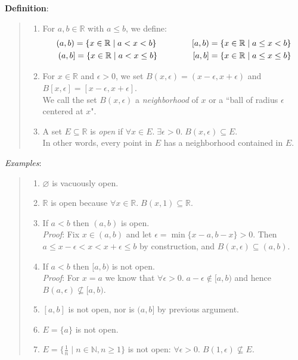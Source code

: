 \documentclass[11pt]{article}
\begin{document}
\textbf{Definition}:
\begin{quote}\vspace{-0.3cm}
\begin{enumerate}
	\item For $a,b \in \mathbb{R}$ with $a \leq b$, we define:
	\begin{align*}
		(a,b) = \{x \in \mathbb{R} \mid a < x < b\} \hspace{1.5cm} [a, b) = \{x \in \mathbb{R} \mid a \leq x < b\}\\
		(a,b] = \{x \in \mathbb{R} \mid a < x \leq b\} \hspace{1.5cm} [a,b] = \{x \in \mathbb{R} \mid a \leq x \leq b\}
	\end{align*}

	\item For $x \in \mathbb{R}$ and $\epsilon > 0$, we set $B(x, \epsilon) = (x-\epsilon, x + \epsilon)$ and $B[x, \epsilon] = [x-\epsilon, x + \epsilon]$.\\
	We call the set $B(x, \epsilon)$ a \emph{neighborhood} of $x$ or a ``ball of radius $\epsilon$ centered at $x$".

	\item A set $E \subseteq \mathbb{R}$ is \emph{open} if $\forall x \in E.\; \exists \epsilon > 0.\; B(x, \epsilon) \subseteq E$.\\
	In other words, every point in $E$ has a neighborhood contained in $E$.
\end{enumerate}
\end{quote}
\emph{Examples}:
\begin{quote}\vspace{-0.3cm}
	\begin{enumerate}
	\item $\varnothing$ is vacuously open.

	\item $\mathbb{R}$ is open because $\forall x \in \mathbb{R}.\; B(x, 1) \subseteq \mathbb{R}$.

	\item If $a < b$ then $(a,b)$ is open.\\
	\emph{Proof}: Fix $x \in (a,b)$ and let $\epsilon = \min\{x-a, b-x\} > 0$. Then $a \leq x - \epsilon < x < x + \epsilon \leq b$ by construction, and $B(x, \epsilon) \subseteq (a,b)$.

	\item If $a < b$ then $[a,b)$ is not open.\\
	\emph{Proof}: For $x = a$ we know that $\forall \epsilon > 0.\; a - \epsilon \notin [a, b)$ and hence $B(a, \epsilon) \not \subseteq [a,b)$.

	\item $[a,b]$ is not open, nor is $(a,b]$ by previous argument.
	\item $E = \{a\}$ is not open.
	\item $E = \{\frac{1}{n} \mid n \in \mathbb{N}, n \geq 1\}$ is not open: $\forall \epsilon > 0.\; B(1, \epsilon) \not \subseteq E$.
	\end{enumerate}
\end{quote}
\end{document}
